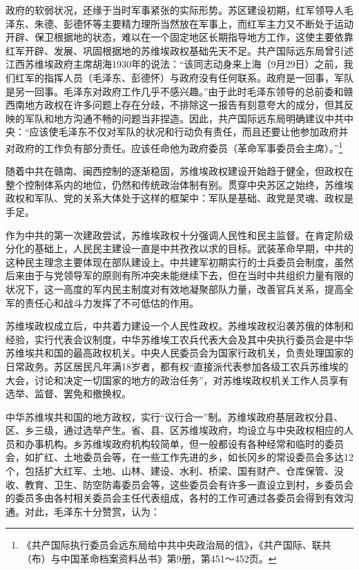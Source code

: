 政府的软弱状况，还缘于当时军事紧张的实际形势。苏区建设初期，红军领导人毛泽东、朱德、彭德怀等主要精力理所当然放在军事上，而红军主力又不断处于运动开辟、保卫根据地的状态，难以在一个固定地区长期指导地方工作，这使主要依靠红军开辟、发展、巩固根据地的苏维埃政权基础先天不足。共产国际远东局曾引述江西苏维埃政府主席胡海1930年的说法：“该同志动身来上海（9月29日）之前，我们红军的指挥人员（毛泽东、彭德怀）与政府没有任何联系。政府是一回事，军队是另一回事。毛泽东对政府工作几乎不感兴趣。”由于此时毛泽东领导的总前委和赣西南地方政权在许多问题上存在分歧，不排除这一报告有刻意夸大的成分，但其反映的军队和地方沟通不畅的问题当非捏造。因此，共产国际远东局明确建议中共中央：“应该使毛泽东不仅对军队的状况和行动负有责任，而且还要让他参加政府并对政府的工作负有部分责任。应该任命他为政府委员（革命军事委员会主席）。”\footnote{《共产国际执行委员会远东局给中共中央政治局的信》，《共产国际、联共（布）与中国革命档案资料丛书》第9册，第451～452页。}


随着中共在赣南、闽西控制的逐渐稳固，苏维埃政权建设开始趋于健全，但政权在整个控制体系内的地位，仍然和传统政治体制有别。贯穿中央苏区之始终，苏维埃政权和军队、党的关系大体处于这样的框架中：军队是基础、政党是灵魂、政权是手足。


作为中共的第一次建政尝试，苏维埃政权十分强调人民性和民主监督。在肯定阶级分化的基础上，人民民主建设一直是中共孜孜以求的目标。武装革命早期，中共的这种民主理念主要体现在部队建设上。中共建军初期实行的士兵委员会制度，虽然后来由于与党领导军的原则有所冲突未能继续下去，但在当时中共组织力量有限的状况下，这一高度的军内民主制度对有效地凝聚部队力量，改善官兵关系，提高全军的责任心和战斗力发挥了不可低估的作用。


苏维埃政权成立后，中共着力建设一个人民性政权。苏维埃政权沿袭苏俄的体制和经验，实行代表会议制度，中华苏维埃工农兵代表大会及其中央执行委员会是中华苏维埃共和国的最高政权机关。中央人民委员会为国家行政机关，负责处理国家的日常政务。苏区居民凡年满18岁者，都有权“直接派代表参加各级工农兵苏维埃的大会，讨论和决定一切国家的地方的政治任务”，对苏维埃政权机关工作人员享有选举、监督、罢免和撤换权。


中华苏维埃共和国的地方政权，实行“议行合一”制。苏维埃政府基层政权分县、区、乡三级，通过选举产生。省、县、区苏维埃政府，均设立与中央政权相应的人员和办事机构。乡苏维埃政府机构较简单，但一般都设有各种经常和临时的委员会，如扩红、土地委员会等，在一些工作先进的乡，如长冈乡的常设委员会多达12个，包括扩大红军、土地、山林、建设、水利、桥梁、国有财产、仓库保管、没收、教育、卫生、防空防毒委员会等，这些委员会有许多一直设立到村，乡委员会的委员多由各村相关委员会主任代表组成，各村的工作可通过各委员会得到有效沟通。对此，毛泽东十分赞赏，认为：

